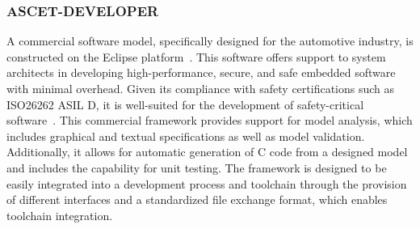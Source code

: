 \subsubsection{ASCET-DEVELOPER}  
A commercial software model, specifically designed for the automotive industry, is constructed on the Eclipse platform~\cite{etas, exp}. This software offers support to system architects in developing high-performance, secure, and safe embedded software with minimal overhead. Given its compliance with safety certifications such as ISO26262 ASIL D, it is well-suited for the development of safety-critical software~\cite{iso26262}.
This commercial framework provides support for model analysis, which includes graphical and textual specifications as well as model validation. Additionally, it allows for automatic generation of C code from a designed model and includes the capability for unit testing. The framework is designed to be easily integrated into a development process and toolchain through the provision of different interfaces and a standardized file exchange format, which enables toolchain integration.




